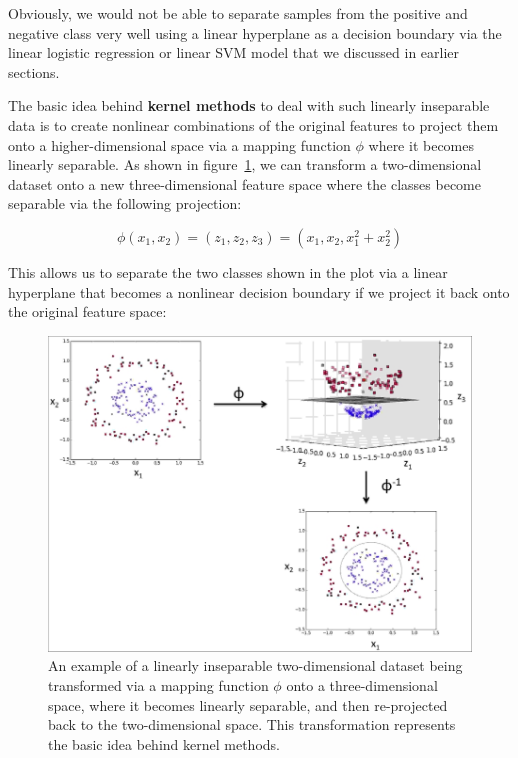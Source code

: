 \documentclass[11pt]{article}
\begin{document}
    Obviously, we would not be able to separate samples from the
    positive and negative class very well using a linear hyperplane
    as a decision boundary via the linear logistic regression or
    linear SVM model that we discussed in earlier sections.

    The basic idea behind \textbf{kernel methods} to deal with such linearly inseparable data is to create nonlinear combinations of the original features to project them onto a higher-dimensional space via a mapping function $\phi$ where it becomes linearly separable. As shown in figure~\ref{fig:kernel}, we can transform a two-dimensional dataset onto a new three-dimensional feature space where the classes become separable via the following projection:

    \begin{equation}
        \label{eq:kern_ex}
        \phi(x_1, x_2) = (z_1, z_2, z_3) = (x_1, x_2, x_1^2 + x_2^2)
    \end{equation}

    This allows us to separate the two classes shown in the plot via a linear hyperplane that becomes a nonlinear decision boundary if we project it back onto the original feature space:

    \begin{figure}[hbt!]
        \centering
        \includegraphics[width=1\linewidth,trim=4 4 4 4,clip]{svm/img/kernel.jpg}
        \caption{An example of a linearly inseparable two-dimensional dataset being transformed via a mapping function $\phi$ onto a three-dimensional space, where it becomes linearly separable, and then re-projected back to the two-dimensional space. This transformation represents the basic idea behind kernel methods.}
        \label{fig:kernel}
    \end{figure}
\end{document}
